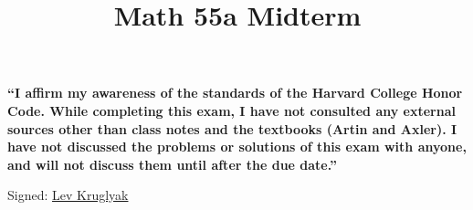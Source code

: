 \documentclass[11pt,letterpaper]{article}
\title{\textbf{Math 55a Midterm}}
\begin{document}
\maketitle
\setcounter{page}{0}
\thispagestyle{empty}

{\bf ``I affirm my awareness of the standards of the Harvard College Honor
Code. While completing this exam, I have not consulted any external sources other than class notes
and the textbooks (Artin and Axler). I have not discussed the problems or solutions of this
exam with anyone, and will not discuss them until after the due date.''%
\bigskip

Signed: \underline{Lev Kruglyak}}
\vskip1cm

\pagebreak


\pagebreak


\pagebreak


\pagebreak


\pagebreak


\pagebreak

\end{document}
